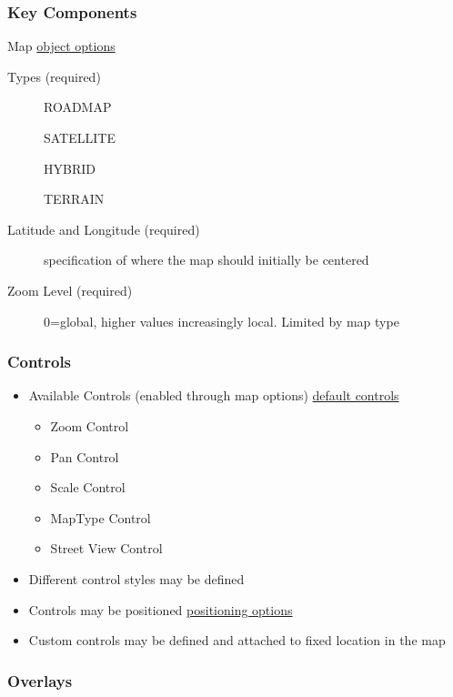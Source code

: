 \documentclass[]{article}
\begin{document}
\subsubsection{Key Components}\label{key-components}

Map \href{http://tinyurl.com/mlsj3ar}{object options}

\begin{description}
\item[Types (required)]
ROADMAP

SATELLITE

HYBRID

TERRAIN
\item[Latitude and Longitude (required)]
specification of where the map should initially be centered
\item[Zoom Level (required)]
0=global, higher values increasingly local. Limited by map type
\end{description}

\subsubsection{Controls}\label{controls}

\begin{itemize}
\itemsep1pt\parskip0pt
\item
  Available Controls (enabled through map options)
  \href{http://tinyurl.com/nryup5j}{default controls}

  \begin{itemize}
  \itemsep1pt\parskip0pt
  \item
    Zoom Control
  \item
    Pan Control
  \item
    Scale Control
  \item
    MapType Control
  \item
    Street View Control
  \end{itemize}
\item
  Different control styles may be defined
\item
  Controls may be positioned
  \href{http://tinyurl.com/p3hc5gk}{positioning options}
\item
  Custom controls may be defined and attached to fixed location in the
  map
\end{itemize}

\subsubsection{Overlays}\label{overlays}
\end{document}
